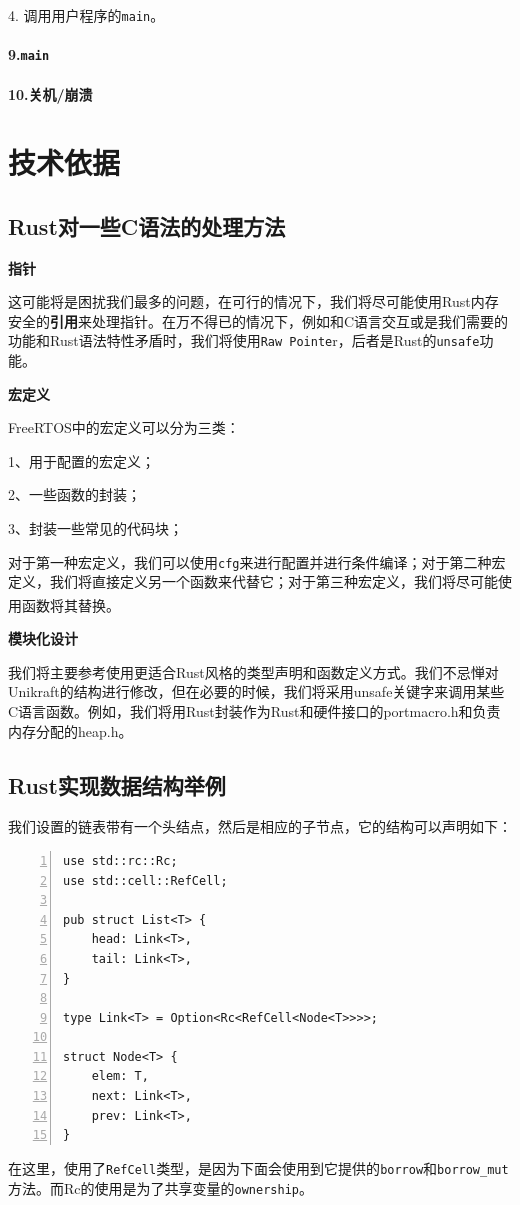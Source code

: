 \documentclass[UTF8,fontset=none,linespread=1.15]{ctexart}
\let\nosupcite\cite
\renewcommand*{\cite}[1]{\textsuperscript{\nosupcite{#1}}}
\begin{document}
4. 调用用户程序的\texttt{main}。
\paragraph{9.\texttt{main}}
\paragraph{10.关机/崩溃}


\section{技术依据}

\subsection{Rust对一些C语法的处理方法}
\textbf{指针}

这可能将是困扰我们最多的问题，在可行的情况下，我们将尽可能使用Rust内存安全的\textbf{引用}来处理指针。在万不得已的情况下，例如和C语言交互或是我们需要的功能和Rust语法特性矛盾时，我们将使用\texttt{Raw Pointe}r，后者是Rust的\texttt{unsafe}功能。

\textbf{宏定义}

FreeRTOS中的宏定义可以分为三类：

1、用于配置的宏定义；

2、一些函数的封装；

3、封装一些常见的代码块；

对于第一种宏定义，我们可以使用\texttt{cfg}来进行配置并进行条件编译；对于第二种宏定义，我们将直接定义另一个函数来代替它；对于第三种宏定义，我们将尽可能使用函数将其替换。\cite{e}

\textbf{模块化设计}

我们将主要参考使用更适合Rust风格的类型声明和函数定义方式。我们不忌惮对Unikraft的结构进行修改，但在必要的时候，我们将采用unsafe关键字来调用某些C语言函数。例如，我们将用Rust封装作为Rust和硬件接口的portmacro.h和负责内存分配的heap.h。
\subsection{Rust实现数据结构举例}
我们设置的链表带有一个头结点，然后是相应的子节点，它的结构可以声明如下：
\begin{lstlisting}[numbers=left]
use std::rc::Rc;
use std::cell::RefCell;

pub struct List<T> {
	head: Link<T>,
	tail: Link<T>,
}

type Link<T> = Option<Rc<RefCell<Node<T>>>>;

struct Node<T> {
	elem: T,
	next: Link<T>,
	prev: Link<T>,
}
\end{lstlisting}
在这里，使用了\texttt{RefCell}类型，是因为下面会使用到它提供的\texttt{borrow}和\texttt{borrow\_mut}方法。而Rc的使用是为了共享变量的\texttt{ownership}。
\end{document}
